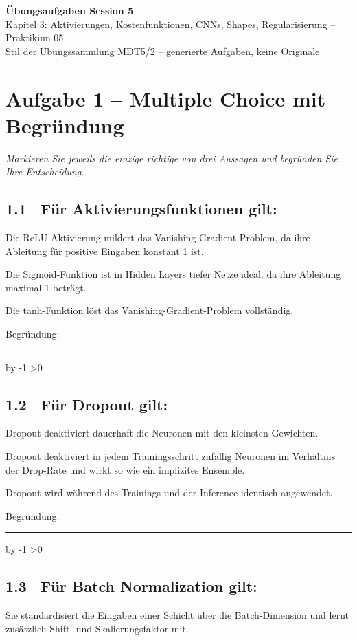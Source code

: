 \documentclass[10pt,a4paper]{article}
\newcommand{\mcbox}{\raisebox{-1pt}{\fbox{\rule{0pt}{7pt}\rule{7pt}{0pt}}}\hspace{6pt}}
\newcommand{\antwortlinien}[1]{%
  \par\vspace{2pt}%
  \newcount\zeilen \zeilen=#1
  \loop
    \noindent\rule{\linewidth}{0.4pt}\par\vspace{11pt}%
    \advance\zeilen by -1
  \ifnum\zeilen>0 \repeat
}
\begin{document}
\begin{center}
  {\Large\bfseries Übungsaufgaben Session 5}\\[4pt]
  {\large Kapitel 3: Aktivierungen, Kostenfunktionen, CNNs, Shapes, Regularisierung -- Praktikum 05}\\[4pt]
  \small Stil der Übungssammlung MDT5/2 -- generierte Aufgaben, keine Originale
\end{center}

\vspace{4pt}

\section*{Aufgabe 1 -- Multiple Choice mit Begründung}
\emph{Markieren Sie jeweils die einzige richtige von drei Aussagen und begründen Sie Ihre Entscheidung.}

\subsection*{1.1 \ Für Aktivierungsfunktionen gilt:}
\mcbox Die ReLU-Aktivierung mildert das Vanishing-Gradient-Problem, da ihre Ableitung
für positive Eingaben konstant 1 ist.

\mcbox Die Sigmoid-Funktion ist in Hidden Layers tiefer Netze ideal, da ihre Ableitung
maximal 1 beträgt.

\mcbox Die tanh-Funktion löst das Vanishing-Gradient-Problem vollständig.

Begründung:
\antwortlinien{2}

\subsection*{1.2 \ Für Dropout gilt:}
\mcbox Dropout deaktiviert dauerhaft die Neuronen mit den kleinsten Gewichten.

\mcbox Dropout deaktiviert in jedem Trainingsschritt zufällig Neuronen im Verhältnis
der Drop-Rate und wirkt so wie ein implizites Ensemble.

\mcbox Dropout wird während des Trainings und der Inference identisch angewendet.

Begründung:
\antwortlinien{2}

\subsection*{1.3 \ Für Batch Normalization gilt:}
\mcbox Sie standardisiert die Eingaben einer Schicht über die Batch-Dimension und
lernt zusätzlich Shift- und Skalierungsfaktor mit.
\end{document}
